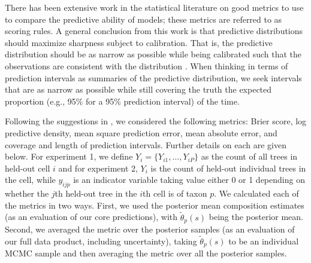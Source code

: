\documentclass[12pt]{article}
\begin{document}
There has been extensive work in the statistical literature on good
metrics to use to compare the predictive ability of models; these
metrics are referred to as scoring rules. A general conclusion from
this work is that predictive distributions should maximize sharpness
subject to calibration. That is, the predictive distribution should
be as narrow as possible while being calibrated such that the observations
are consistent with the distribution \citep{Gnei:etal:2007}. When
thinking in terms of prediction intervals as summaries of the predictive
distribution, we seek intervals that are as narrow as possible while
still covering the truth the expected proportion (e.g., 95\% for a
95\% prediction interval) of the time. 

Following the suggestions in \cite{Gnei:etal:2007}, we considered
the following metrics: Brier score, log predictive density, mean square
prediction error, mean absolute error, and coverage and length of
prediction intervals. Further details on each are given below. For
experiment 1, we define $Y_{i}=\{Y_{i1},\ldots,Y_{iP}\}$ as the count
of all trees in held-out cell $i$ and for experiment 2, $Y_{i}$
is the count of held-out individual trees in the cell, while $y_{ijp}$
is an indicator variable taking value either 0 or 1 depending on whether
the $j$th held-out tree in the $i$th cell is of taxon $p$. We calculated
each of the metrics in two ways. First, we used the posterior mean
composition estimates (as an evaluation of our core predictions),
with $\tilde{\theta}_{p}(s)$ being the posterior mean. Second, we
averaged the metric over the posterior samples (as an evaluation of
our full data product, including uncertainty), taking $\tilde{\theta}_{p}(s)$
to be an individual MCMC sample and then averaging the metric over
all the posterior samples. 
\end{document}
